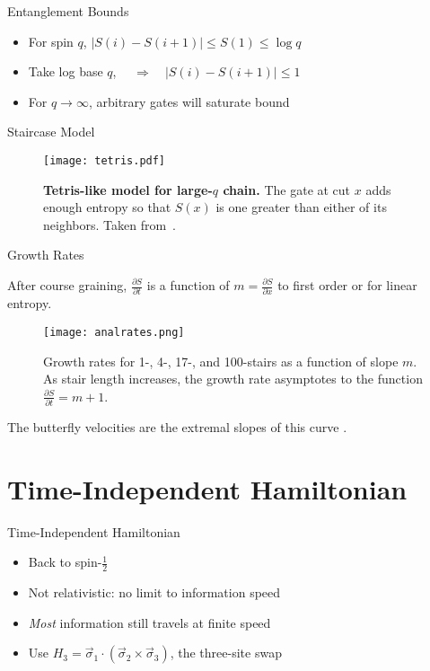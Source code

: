 \documentclass{beamer}
\newcommand{\pd}[2]{\frac{\partial #1}{\partial #2}}
\newcommand{\imp}{\Longrightarrow\quad}
\newcommand{\half}{\frac{1}{2}}
\begin{document}
\begin{frame}{Entanglement Bounds}
\begin{itemize}
	\item For spin $q$, $|S(i) - S(i+1)| \le S(1) \le \log q$
	\item Take log base $q$, $\quad\imp |S(i) - S(i+1)| \le 1$
	\item For $q\to\infty$, arbitrary gates will saturate bound \cite{Nahum2017}
\end{itemize}
\end{frame}

\begin{frame}{Staircase Model}

\begin{figure}
	\centering
	\texttt{[image: tetris.pdf]}
	\caption{\textbf{Tetris-like model for large-$q$ chain.} The gate at cut $x$ adds enough entropy so that $S(x)$ is one greater than either of its neighbors. Taken from~\cite{Nahum2017}.}
	\label{fig:tetris}
\end{figure}

\end{frame}

\begin{frame}{Growth Rates}

After course graining, $\pd{S}{t}$ is a function of $m = \pd{S}{x}$ to first order or for linear entropy.
\begin{figure}
	\centering
	\texttt{[image: analrates.png]}
	\caption{Growth rates for 1-, 4-, 17-, and 100-stairs as a function of slope $m$. As stair length increases, the growth rate asymptotes to the function $\pd{S}{t} = m+1$.}
	\label{fig:growthrates}
\end{figure}
The butterfly velocities are the extremal slopes of this curve \cite{Jonay}.
\end{frame}

\section{Time-Independent Hamiltonian}

\begin{frame}{Time-Independent Hamiltonian}
\begin{itemize}
	\item Back to spin-$\half$
	\item Not relativistic: no limit to information speed
	\item \emph{Most} information still travels at finite speed
	\item Use $H_3 = \vec{\sigma}_1\cdot(\vec{\sigma}_2\times\vec{\sigma}_3)$, the three-site swap
\end{itemize}
\end{frame}
\end{document}
